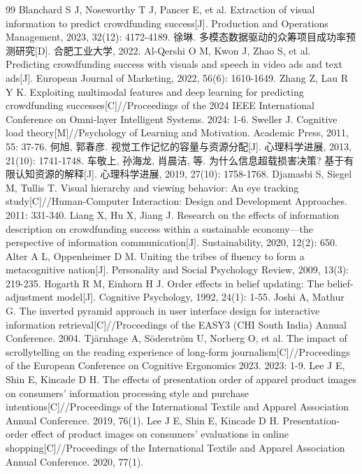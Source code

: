 \begin{thebibliography}{99}
 Blanchard S J, Noseworthy T J, Pancer E, et al. Extraction of visual information to predict crowdfunding success[J]. Production and Operations Management, 2023, 32(12): 4172-4189.
 徐琳. 多模态数据驱动的众筹项目成功率预测研究[D]. 合肥工业大学, 2022.
 Al-Qershi O M, Kwon J, Zhao S, et al. Predicting crowdfunding success with visuals and speech in video ads and text ads[J]. European Journal of Marketing, 2022, 56(6): 1610-1649.
 Zhang Z, Lau R Y K. Exploiting multimodal features and deep learning for predicting crowdfunding successes[C]//Proceedings of the 2024 IEEE International Conference on Omni-layer Intelligent Systems. 2024: 1-6.
 Sweller J. Cognitive load theory[M]//Psychology of Learning and Motivation. Academic Press, 2011, 55: 37-76.
 何旭, 郭春彦. 视觉工作记忆的容量与资源分配[J]. 心理科学进展, 2013, 21(10): 1741-1748.
 车敬上, 孙海龙, 肖晨洁, 等. 为什么信息超载损害决策? 基于有限认知资源的解释[J]. 心理科学进展, 2019, 27(10): 1758-1768.
 Djamasbi S, Siegel M, Tullis T. Visual hierarchy and viewing behavior: An eye tracking study[C]//Human-Computer Interaction: Design and Development Approaches. 2011: 331-340.
 Liang X, Hu X, Jiang J. Research on the effects of information description on crowdfunding success within a sustainable economy—the perspective of information communication[J]. Sustainability, 2020, 12(2): 650.
 Alter A L, Oppenheimer D M. Uniting the tribes of fluency to form a metacognitive nation[J]. Personality and Social Psychology Review, 2009, 13(3): 219-235.
 Hogarth R M, Einhorn H J. Order effects in belief updating: The belief-adjustment model[J]. Cognitive Psychology, 1992, 24(1): 1-55.
 Joshi A, Mathur G. The inverted pyramid approach in user interface design for interactive information retrieval[C]//Proceedings of the EASY3 (CHI South India) Annual Conference. 2004.
 Tjärnhage A, Söderström U, Norberg O, et al. The impact of scrollytelling on the reading experience of long-form journalism[C]//Proceedings of the European Conference on Cognitive Ergonomics 2023. 2023: 1-9.
 Lee J E, Shin E, Kincade D H. The effects of presentation order of apparel product images on consumers' information processing style and purchase intentions[C]//Proceedings of the International Textile and Apparel Association Annual Conference. 2019, 76(1).
 Lee J E, Shin E, Kincade D H. Presentation-order effect of product images on consumers' evaluations in online shopping[C]//Proceedings of the International Textile and Apparel Association Annual Conference. 2020, 77(1).

\end{thebibliography}
